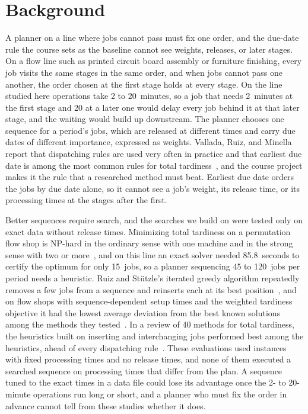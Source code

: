 \section{Background}\label{sec:background}

\sumpara A planner on a line where jobs cannot pass must fix one order, and the due-date rule the course sets as the baseline cannot see weights, releases, or later stages. \sumparaend
\fin On a flow line such as printed circuit board assembly or furniture finishing, every job visits the same stages in the same order, and when jobs cannot pass one another, the order chosen at the first stage holds at every stage. \fine
\fin On the line studied here operations take 2 to 20~minutes, so a job that needs 2~minutes at the first stage and 20 at a later one would delay every job behind it at that later stage, and the waiting would build up downstream. \fine
\fin The planner chooses one sequence for a period's jobs, which are released at different times and carry due dates of different importance, expressed as weights. \fine
\fin Vallada, Ruiz, and Minella report that dispatching rules are used very often in practice and that earliest due date is among the most common rules for total tardiness~\cite{vallada2008review}, and the course project makes it the rule that a researched method must beat. \fine
\fin Earliest due date orders the jobs by due date alone, so it cannot see a job's weight, its release time, or its processing times at the stages after the first. \fine

\sumpara Better sequences require search, and the searches we build on were tested only on exact data without release times. \sumparaend
\fin Minimizing total tardiness on a permutation flow shop is NP-hard in the ordinary sense with one machine and in the strong sense with two or more~\cite{vallada2008review}, and on this line an exact solver needed 85.8~seconds to certify the optimum for only 15~jobs, so a planner sequencing 45 to 120~jobs per period needs a heuristic. \fine
\fin Ruiz and St\"utzle's iterated greedy algorithm repeatedly removes a few jobs from a sequence and reinserts each at its best position~\cite{ruiz2007ig}, and on flow shops with sequence-dependent setup times and the weighted tardiness objective it had the lowest average deviation from the best known solutions among the methods they tested~\cite{ruiz2008igwt}. \fine
\fin In a review of 40 methods for total tardiness, the heuristics built on inserting and interchanging jobs performed best among the heuristics, ahead of every dispatching rule~\cite{vallada2008review}. \fine
\fin These evaluations used instances with fixed processing times and no release times, and none of them executed a searched sequence on processing times that differ from the plan. \fine
\fin A sequence tuned to the exact times in a data file could lose its advantage once the 2- to 20-minute operations run long or short, and a planner who must fix the order in advance cannot tell from these studies whether it does. \fine

